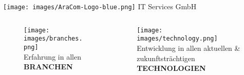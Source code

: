 \documentclass[aspectratio=169]{beamer}
\begin{document}
\begin{frame}{\texttt{[image: images/AraCom-Logo-blue.png]} IT Services GmbH}
{\begin{columns}
\begin{column}{0.20\textwidth}
        \begin{figure}
          \centering
          \texttt{[image: images/branches.png]}\\
          Erfahrung in allen\\\textbf{BRANCHEN}\newline\newline
        \end{figure}
      \end{column}
      \begin{column}{0.20\textwidth}
        \begin{figure}
          \centering
          \texttt{[image: images/technology.png]}\\
          Entwicklung in allen aktuellen \& zukunftsträchtigen\\
          \textbf{TECHNOLOGIEN}
        \end{figure}
      \end{column}
    \end{columns}
  }
\end{frame}
\end{document}
